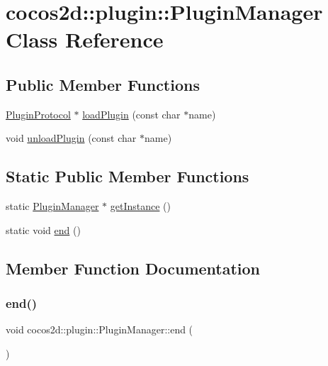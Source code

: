 \hypertarget{classcocos2d_1_1plugin_1_1PluginManager}{}\section{cocos2d\+:\+:plugin\+:\+:Plugin\+Manager Class Reference}
\label{classcocos2d_1_1plugin_1_1PluginManager}
\subsection*{Public Member Functions}
\begin{DoxyCompactItemize}
\item 
\hyperlink{classcocos2d_1_1plugin_1_1PluginProtocol}{Plugin\+Protocol} $\ast$ \hyperlink{classcocos2d_1_1plugin_1_1PluginManager_acbef8c04bbe6abb61358206b9c2799bb}{load\+Plugin} (const char $\ast$name)
\item 
void \hyperlink{classcocos2d_1_1plugin_1_1PluginManager_a3d92f905f9a62627d0d2ad9656ea568c}{unload\+Plugin} (const char $\ast$name)
\end{DoxyCompactItemize}
\subsection*{Static Public Member Functions}
\begin{DoxyCompactItemize}
\item 
static \hyperlink{classcocos2d_1_1plugin_1_1PluginManager}{Plugin\+Manager} $\ast$ \hyperlink{classcocos2d_1_1plugin_1_1PluginManager_a5040dcfe930e900c64a388521b64e1c5}{get\+Instance} ()
\item 
static void \hyperlink{classcocos2d_1_1plugin_1_1PluginManager_a8f4506e5f3e3e1b55d27665c4688d946}{end} ()
\end{DoxyCompactItemize}


\subsection{Member Function Documentation}
\mbox{\label{classcocos2d_1_1plugin_1_1PluginManager_a8f4506e5f3e3e1b55d27665c4688d946}} 
\subsubsection{\texorpdfstring{end()}{end()}}
{\footnotesize\ttfamily void cocos2d\+::plugin\+::\+Plugin\+Manager\+::end (\begin{DoxyParamCaption}{ }\end{DoxyParamCaption})\hspace{0.3cm}{\ttfamily [static]}}

